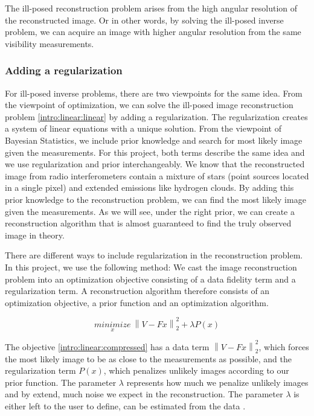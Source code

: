 The ill-posed reconstruction problem arises from the high angular resolution of the reconstructed image. Or in other words, by solving the ill-posed inverse problem, we can acquire an image with higher angular resolution from the same visibility measurements.

\subsubsection{Adding a regularization} \label{intro:linear:regularization}
For ill-posed inverse problems, there are two viewpoints for the same idea. From the viewpoint of optimization, we can solve the ill-posed image reconstruction problem \eqref{intro:linear:linear} by adding a regularization. The regularization creates a system of linear equations with a unique solution. From the viewpoint of Bayesian Statistics, we include prior knowledge and search for most likely image given the measurements. For this project, both terms describe the same idea and we use regularization and prior interchangeably. We know that the reconstructed image from radio interferometers contain a mixture of stars (point sources located in a single pixel) and extended emissions like hydrogen clouds. By adding this prior knowledge to the reconstruction problem, we can find the most likely image given the measurements. As we will see, under the right prior, we can create a reconstruction algorithm that is almost guaranteed to find the truly observed image in theory.

There are different ways to include regularization in the reconstruction problem. In this project, we use the following method: We cast the image reconstruction problem into an optimization objective consisting of a data fidelity term and a regularization term. A reconstruction algorithm therefore consists of an optimization objective, a prior function and an optimization algorithm.

\begin{equation}\label{intro:linear:compressed}
\underset{x}{minimize} \: \left \| V - Fx \right \|_2^2 + \lambda P(x)
\end{equation}

The objective \eqref{intro:linear:compressed} has a data term $\left \| V - Fx \right \|_2^2$, which forces the most likely image to be as close to the measurements as possible, and the regularization term $P(x)$, which penalizes unlikely images according to our prior function. The parameter $\lambda$ represents how much we penalize unlikely images and by extend, much noise we expect in the reconstruction. The parameter $\lambda$ is either left to the user to define, can be estimated from the data \cite{miller1970least}. 

